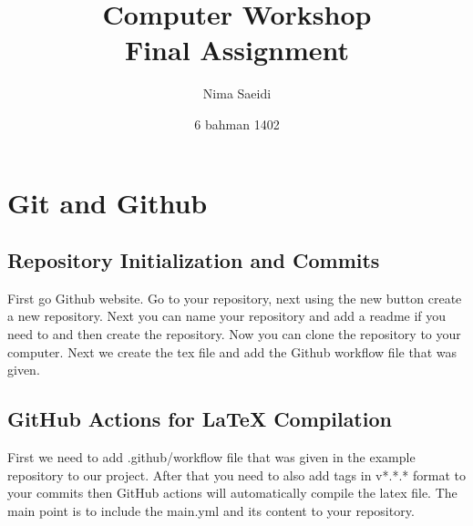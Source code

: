 \documentclass[titlepage]{article}
\title{\textbf{Computer Workshop\\ Final Assignment}}
\author{Nima Saeidi}
\date{6 bahman 1402}
\begin{document}
\maketitle
\tableofcontents

\newpage


\section{Git and Github}
\subsection{Repository Initialization and Commits}
First go Github website. Go to your repository, next using the new button create a new repository. Next you can name your repository and add a readme if you need to and then create the repository. Now you can clone the repository to your computer. Next we create the tex file and add the Github workflow file that was given.

\subsection{GitHub Actions for LaTeX Compilation}
First we need to add .github/workflow file that was given in the example repository to our project. After that you need to also add tags in v*.*.* format to your commits then GitHub actions will automatically compile the latex file. The main point is to include the main.yml and its content to your repository.
\end{document}
